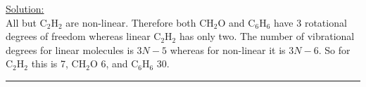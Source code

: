 \noindent
\underline{Solution:}\\

\noindent
All but C$_2$H$_2$ are non-linear. Therefore both CH$_2$O and C$_6$H$_6$ have 3 rotational degrees of freedom whereas linear C$_2$H$_2$ has only two. The number of vibrational degrees for linear molecules is $3N - 5$ whereas for non-linear it is $3N - 6$. So for C$_2$H$_2$ this is 7, CH$_2$O 6, and C$_6$H$_6$ 30.

\hrule\vspace{0.5cm}



